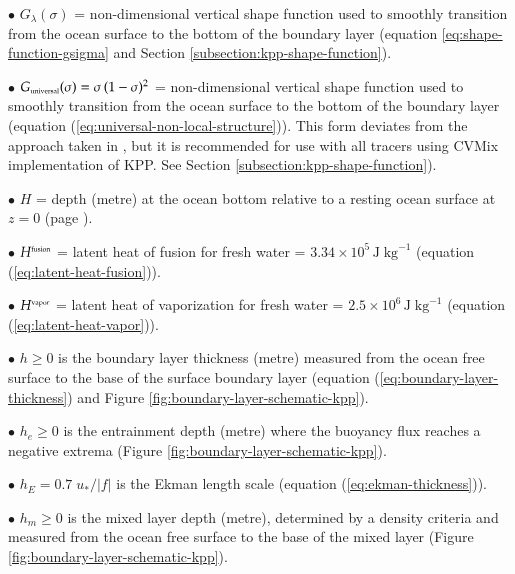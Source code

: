 \begin{trivlist}
 \item[$\bullet$] $G _{\lambda} (\sigma)$ = non-dimensional vertical
   shape function used to smoothly transition from the ocean surface
   to the bottom of the boundary layer (equation
   \ref{eq:shape-function-gsigma} and Section
   \ref{subsection:kpp-shape-function}).

 \item[$\bullet$] $G _{\mbox{\tiny universal}}(\sigma) = \sigma \,
   (1-\sigma)^{2}$ = non-dimensional vertical shape function used to
   smoothly transition from the ocean surface to the bottom of the
   boundary layer (equation (\ref{eq:universal-non-local-structure})).
   This form deviates from the approach taken in \cite{LargeKPP}, but
   it is recommended for use with all tracers using CVMix
   implementation of KPP. See Section
   \ref{subsection:kpp-shape-function}).

\item[$\bullet$] $H$ = depth (metre) at the ocean bottom relative to a
  resting ocean surface at $z=0$ (page
  \pageref{geopotential_defined}).

\item[$\bullet$] $H^{\mbox{\tiny fusion}}$ = latent heat of fusion for
  fresh water = $3.34 \times 10^{5} \, \mbox{J} \;\mbox{kg}^{-1}$
  (equation (\ref{eq:latent-heat-fusion})).

\item[$\bullet$] $H^{\mbox{\tiny vapor}}$ = latent heat of
  vaporization for fresh water = $2.5 \times 10^{6} \, \mbox{J} \;
  \mbox{kg}^{-1}$ (equation (\ref{eq:latent-heat-vapor})).

\item[$\bullet$] $h \ge 0$ is the boundary layer thickness (metre) measured from
  the ocean free surface to the base of the surface boundary layer
  (equation (\ref{eq:boundary-layer-thickness}) and Figure
  \ref{fig:boundary-layer-schematic-kpp}).

\item[$\bullet$] $h_{e} \ge 0$ is the entrainment depth (metre) where
  the buoyancy flux reaches a negative extrema (Figure
  \ref{fig:boundary-layer-schematic-kpp}).

\item[$\bullet$] $h_{E} = 0.7 \; u_{*} /|f|$ is the Ekman length scale
  (equation (\ref{eq:ekman-thickness})).

\item[$\bullet$] $h_{m} \ge 0$ is the mixed layer depth (metre),
  determined by a density criteria and measured from the ocean free
  surface to the base of the mixed layer (Figure
  \ref{fig:boundary-layer-schematic-kpp}).


\end{trivlist}
